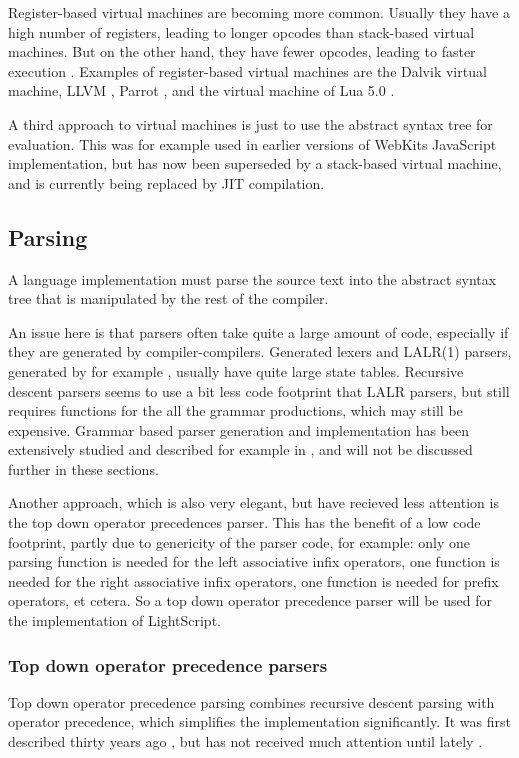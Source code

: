 \documentclass[11pt]{report}
\begin{document}
Register-based virtual machines are becoming more common. 
Usually they have a high number of registers, leading to longer opcodes than stack-based virtual machines. But on the other hand, they have fewer opcodes, leading to faster execution \cite{register-vs-stack1, register-vs-stack2}. 
Examples of register-based virtual machines are the Dalvik \cite{dalvik-vm} virtual machine, LLVM \cite{llvm}, Parrot \cite{parrot}, and the virtual machine of Lua 5.0 \cite{luavm}.

A third approach to virtual machines is just to use the abstract syntax tree for evaluation. This was for example used in earlier versions of WebKits JavaScript implementation, but has now been superseded by a stack-based virtual machine, and is currently being replaced by JIT compilation.

\subsection{Parsing}
A language implementation must parse the source text into the abstract syntax tree that is manipulated by the rest of the compiler.

An issue here is that parsers often take quite a large amount of code, especially if they are generated by compiler-compilers.
Generated lexers and LALR(1) parsers, generated by for example \cite{yacc, yacc2}, usually have quite large state tables.
Recursive descent parsers seems to use a bit less code footprint that LALR parsers, but still requires functions for the all the grammar productions, which may still be expensive.
Grammar based parser generation and implementation has been extensively studied and described for example in  \cite{basics-of-compiler-design, grammar}, and will not be discussed further in these sections.

Another approach, which is also very elegant, 
but have recieved less attention is the
top down operator precedences parser.
This has the benefit of a low code footprint,
partly due to genericity of the parser code,
for example: only one parsing
function is needed for the left associative infix operators,
one function is needed for the right associative infix operators,
one function is needed for prefix operators, et cetera.
So a top down operator precedence parser will be used for the implementation of LightScript.


\subsubsection{Top down operator precedence parsers}
\label{tdop}
Top down operator precedence parsing combines recursive descent parsing with operator precedence, which simplifies the implementation significantly.
It was first described thirty years ago \cite{top-down-operator-precedence}, but has not received much attention until lately \cite{beautiful-code, crockford-tdop}.
\end{document}
